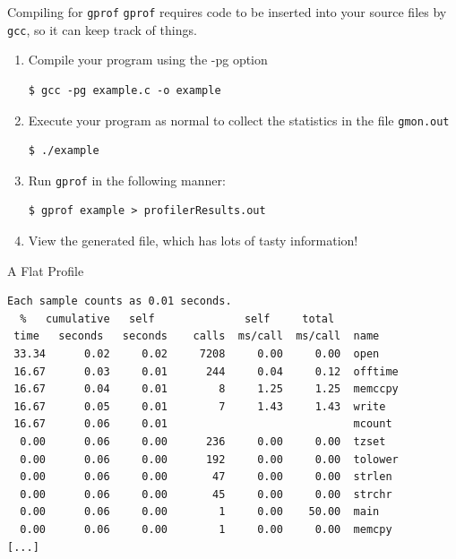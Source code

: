 \documentclass[11pt]{beamer}
\begin{document}
\begin{frame}[fragile=singleslide]{Compiling for \texttt{gprof}}
\texttt{gprof} requires code to be inserted into your source files by \texttt{gcc}, so it can keep track of things.  
\begin{enumerate}
\item Compile your program using the -pg option
\begin{lstlisting}[style=terminal]
$ gcc -pg example.c -o example
\end{lstlisting}
\item Execute your program as normal to collect the statistics in the file \texttt{gmon.out}
\begin{lstlisting}[style=terminal]
$ ./example
\end{lstlisting}
\item Run \texttt{gprof} in the following manner:
\begin{lstlisting}[style=terminal]
$ gprof example > profilerResults.out
\end{lstlisting}
\item View the generated file, which has lots of tasty information! 
\end{enumerate}
\end{frame}


\begin{frame}[fragile = singleslide]{A Flat Profile}
\footnotesize
\begin{verbatim}
Each sample counts as 0.01 seconds.
  %   cumulative   self              self     total
 time   seconds   seconds    calls  ms/call  ms/call  name
 33.34      0.02     0.02     7208     0.00     0.00  open
 16.67      0.03     0.01      244     0.04     0.12  offtime
 16.67      0.04     0.01        8     1.25     1.25  memccpy
 16.67      0.05     0.01        7     1.43     1.43  write
 16.67      0.06     0.01                             mcount
  0.00      0.06     0.00      236     0.00     0.00  tzset
  0.00      0.06     0.00      192     0.00     0.00  tolower
  0.00      0.06     0.00       47     0.00     0.00  strlen
  0.00      0.06     0.00       45     0.00     0.00  strchr
  0.00      0.06     0.00        1     0.00    50.00  main
  0.00      0.06     0.00        1     0.00     0.00  memcpy
[...]
\end{verbatim}
\end{frame}
\end{document}
